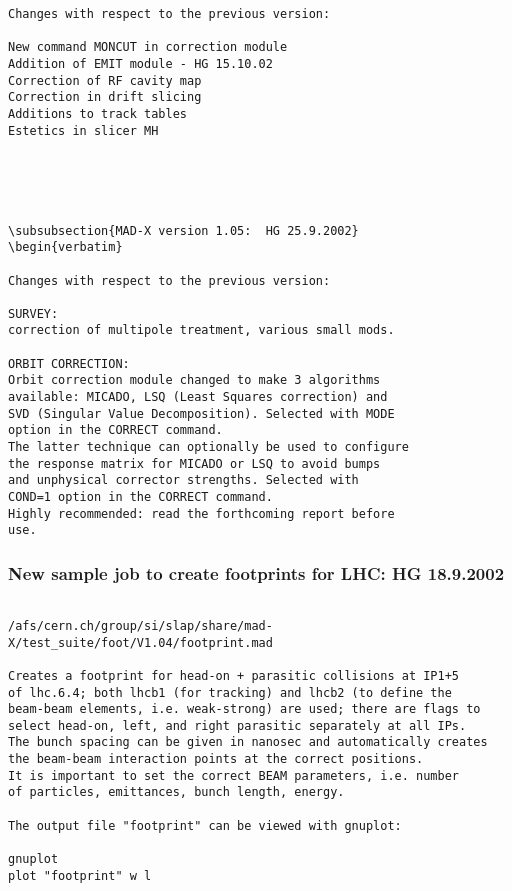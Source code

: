 \begin{verbatim}
Changes with respect to the previous version:

New command MONCUT in correction module
Addition of EMIT module - HG 15.10.02
Correction of RF cavity map
Correction in drift slicing
Additions to track tables
Estetics in slicer MH





\subsubsection{MAD-X version 1.05:  HG 25.9.2002}
\begin{verbatim}

Changes with respect to the previous version:

SURVEY:
correction of multipole treatment, various small mods.

ORBIT CORRECTION:
Orbit correction module changed to make 3 algorithms
available: MICADO, LSQ (Least Squares correction) and
SVD (Singular Value Decomposition). Selected with MODE
option in the CORRECT command.
The latter technique can optionally be used to configure
the response matrix for MICADO or LSQ to avoid bumps
and unphysical corrector strengths. Selected with
COND=1 option in the CORRECT command.
Highly recommended: read the forthcoming report before
use.
\end{verbatim}



\subsubsection{New sample job to create footprints for LHC:  HG 18.9.2002}
\begin{verbatim}

/afs/cern.ch/group/si/slap/share/mad-X/test_suite/foot/V1.04/footprint.mad

Creates a footprint for head-on + parasitic collisions at IP1+5 
of lhc.6.4; both lhcb1 (for tracking) and lhcb2 (to define the
beam-beam elements, i.e. weak-strong) are used; there are flags to
select head-on, left, and right parasitic separately at all IPs.
The bunch spacing can be given in nanosec and automatically creates
the beam-beam interaction points at the correct positions.
It is important to set the correct BEAM parameters, i.e. number
of particles, emittances, bunch length, energy.

The output file "footprint" can be viewed with gnuplot:

gnuplot
plot "footprint" w l

\end{verbatim}

